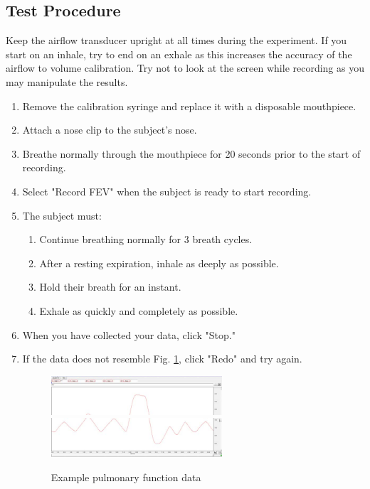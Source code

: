 \documentclass{article}
\begin{document}
\subsection*{Test Procedure}
\begin{info}
	Keep the airflow transducer upright at all times during the experiment. If you start on an inhale, try to end on an exhale as this increases the accuracy of the airflow to volume calibration. Try not to look at the screen while recording as you may manipulate the results.
\end{info}
\begin{enumerate}
	\item Remove the calibration syringe and replace it with a disposable mouthpiece.
	\item Attach a nose clip to the subject's nose.
	\item Breathe normally through the mouthpiece for 20 seconds prior to the start of recording.
	\item Select "Record FEV" when the subject is ready to start recording.
	\item The subject must:\begin{enumerate}
		\item Continue breathing normally for 3 breath cycles.
		\item After a resting expiration, inhale as deeply as possible.
		\item Hold their breath for an instant.
		\item Exhale as quickly and completely as possible.
	\end{enumerate}

	\item When you have collected your data, click "Stop."
	\item If the data does not resemble Fig. \ref{example_2}, click "Redo" and try again.
	\begin{figure}[h]
	\centering\includegraphics[width=0.6\textwidth]{../images/PF_I_7a.jpg}
	\includegraphics[width=0.6\textwidth]{../images/PF_I_7b.jpg}
		\caption{Example pulmonary function data}
		\label{example_2}
		\end{figure}
	

\end{enumerate}
\end{document}
